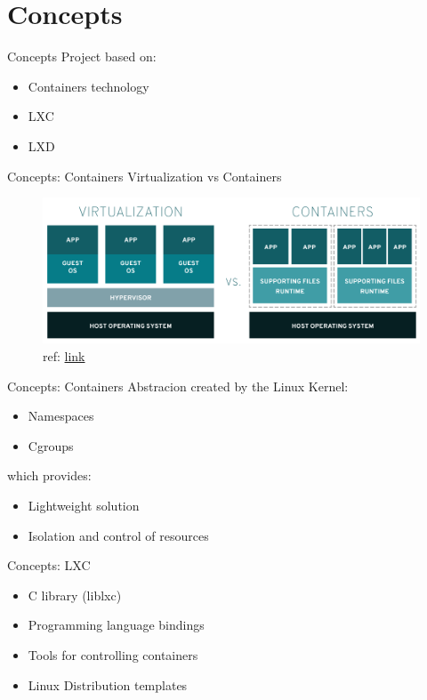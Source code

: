 \documentclass[10pt,english,handout,aspectradio=169]{beamer}
\begin{document}
\section{Concepts}
\begin{frame}{Concepts}
    Project based on:
    \begin{itemize}
        \item Containers technology
        \item LXC
        \item LXD
    \end{itemize}
\end{frame}
\begin{frame}{Concepts: Containers}
Virtualization vs Containers
\begin{figure}
    \centering
    \includegraphics[width=\textwidth,height=\textheight,keepaspectratio]{img/02-state-virtualization-vs-containers} 
    \caption{ref: \href{https://www.redhat.com/en/topics/containers/whats-a-linux-container}{link}}
\end{figure}
\end{frame}
\begin{frame}{Concepts: Containers}
Abstracion created by the Linux Kernel:
\begin{itemize}
    \item Namespaces
    \item Cgroups
\end{itemize}
which provides:
\begin{itemize}
    \item Lightweight solution
    \item Isolation and control of resources
\end{itemize}
\end{frame}
\begin{frame}{Concepts: LXC}
\begin{itemize}
    \item C library (liblxc)
    \item Programming language bindings
    \item Tools for controlling containers
    \item Linux Distribution templates
\end{itemize}
    
\end{frame}
\end{document}
